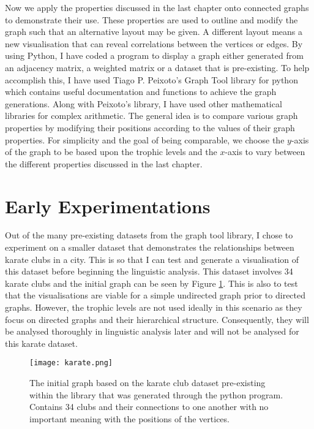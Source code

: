 Now we apply the properties discussed in the last chapter onto connected graphs to demonstrate their use. These properties are used to outline and modify the graph such that an alternative layout may be given. A different layout means a new visualisation that can reveal correlations between the vertices or edges. By using Python, I have coded a program to display a graph either generated from an adjacency matrix, a weighted matrix or a dataset that is pre-existing. To help accomplish this, I have used Tiago P. Peixoto's Graph Tool library for python \cite{peixoto_graph-tool_2014} which contains useful documentation and functions to achieve the graph generations. Along with Peixoto's library, I have used other mathematical libraries for complex arithmetic. The general idea is to compare various graph properties by modifying their positions according to the values of their graph properties. For simplicity and the goal of being comparable, we choose the $y$-axis of the graph to be based upon the trophic levels and the $x$-axis to vary between the different properties discussed in the last chapter.

\section{Early Experimentations}
Out of the many pre-existing datasets from the graph tool library, I chose to experiment on a smaller dataset that demonstrates the relationships between karate clubs in a city. This is so that I can test and generate a visualisation of this dataset before beginning the linguistic analysis. This dataset involves 34 karate clubs and the initial graph can be seen by Figure \ref{fig:karate}. This is also to test that the visualisations are viable for a simple undirected graph prior to directed graphs. However, the trophic levels are not used ideally in this scenario as they focus on directed graphs and their hierarchical structure. Consequently, they will be analysed thoroughly in linguistic analysis later and will not be analysed for this karate dataset.

\begin{figure}[!htb]
	\centering
	\texttt{[image: karate.png]}
	\caption{The initial graph based on the karate club dataset pre-existing within the library that was generated through the python program. Contains 34 clubs and their connections to one another with no important meaning with the positions of the vertices.}
	\label{fig:karate}
\end{figure}

